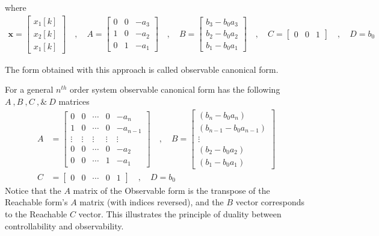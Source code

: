 \documentclass[twoside]{article}
\begin{document}
%
where 
%
\begin{align*}
\mathbf{x} = \left[ \begin{array}{c} x_1[k] \\ x_2[k] \\
x_1[k] \end{array} \right] \quad , \quad
A = \left[ \begin{array}{ccc} 0 & 0 & -a_3 \\ 1 & 0 & -a_2
    \\ 0 & 1 & -a_1 \end{array} \right]
\quad , \quad 
B = \left[ \begin{array}{c} b_3 - b_0 a_3 \\ b_2 - b_0 a_2
    \\ b_1 - b_0 a_1 \end{array} \right]
\quad , \quad
C = \left[ \begin{array}{ccc} 0 & 0 & 1 \end{array} \right]
\quad , \quad
D = b_0
\end{align*}
%

The form obtained with this approach is called
observable canonical form. 

For a general $n^{th}$ order system observable
canonical form has the following $A \ ,  B \ ,  C \ , \& \ D$
matrices
%
\begin{align*}
A &= \left[ \begin{array}{ccccc} 0 & 0 & \cdots & 0 & -a_{n} 
              \\ 1 & 0 & \cdots & 0 & -a_{n-1} 
\\ \vdots & \vdots & \vdots & \vdots & \vdots
\\ 0 & 0 & \cdots & 0 & -a_2
    \\ 0 & 0 & \cdots & 1 & -a_1 \end{array} \right]
\quad , \quad 
B = \left[ \begin{array}{c} (b_n - b_0 a_n)  \\ (b_{n-1} - b_0
             a_{n-1}) \\ \vdots \\ (b_2 - b_0 a_2) \\   (b_1 - b_0
             a_1) 
\end{array} \right]
\\ C &= \left[ \begin{array}{ccccc} 0 & 0 & \cdots &  0 & 1 \end{array} \right]
\quad , \quad
D = b_0
\end{align*}
%
Notice that the $A$ matrix of the Observable form is the transpose of the Reachable form's $A$ matrix (with indices reversed), and the $B$ vector corresponds to the Reachable $C$ vector. This illustrates the principle of duality between controllability and observability.
\end{document}
